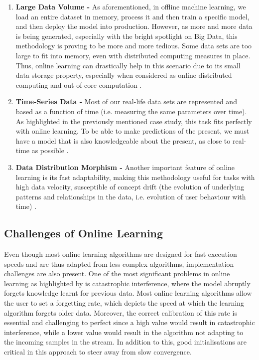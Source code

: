 \begin{enumerate}
\item \textbf{Large Data Volume -}  As aforementioned, in offline machine learning, we load an entire dataset in memory, process it and then train a specific model, and then deploy the model into production. However, as more and more data is being generated, especially with the bright spotlight on Big Data, this methodology is proving to be more and more tedious. Some data sets are too large to fit into memory, even with distributed computing measures in place. Thus, online learning can drastically help in this scenario due to its small data storage property, especially when considered as online distributed computing and out-of-core computation \citep{zhang_projection-free_2017}.

\item \textbf{Time-Series Data -}  Most of our real-life data sets are represented and based as a function of time (i.e. measuring the same parameters over time). As highlighted in the previously mentioned case study, this task fits perfectly with online learning. To be able to make predictions of the present, we must have a model that is also knowledgeable about the present, as close to real-time as possible \citep{hoi_online_2018, Lane:1998:AOL:3000292.3000339}.

\item \textbf{Data Distribution Morphism -}  Another important feature of online learning is its fast adaptability, making this methodology useful for tasks with high data velocity, susceptible of concept drift (the evolution of underlying patterns and relationships in the data, i.e. evolution of user behaviour with time) \citep{hoi_online_2018, Lane:1998:AOL:3000292.3000339}.
\end{enumerate}

\subsection{Challenges of Online Learning}

Even though most online learning algorithms are designed for fast execution speeds and are thus adapted from less complex algorithms, implementation challenges are also present. One of the most significant problems in online learning as highlighted by \citet{gepperth_incremental_2016} is catastrophic interference, where the model abruptly forgets knowledge learnt for previous data. Most online learning algorithms allow the user to set a forgetting rate, which depicts the speed at which the learning algorithm forgets older data. Moreover, the correct calibration of this rate is essential and challenging to perfect since a high value would result in catastrophic interference, while a lower value would result in the algorithm not adapting to the incoming samples in the stream. In addition to this, good initialisations are critical in this approach to steer away from slow convergence.

